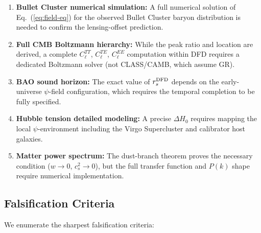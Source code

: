 \documentclass[aps,prd,twocolumn,superscriptaddress,nofootinbib]{revtex4-2}
\begin{document}
\begin{enumerate}
\item \textbf{Bullet Cluster numerical simulation:} A full numerical
  solution of Eq.~(\ref{eq:field-eq}) for the observed Bullet Cluster
  baryon distribution is needed to confirm the lensing-offset prediction.

\item \textbf{Full CMB Boltzmann hierarchy:} While the peak ratio
  and location are derived, a complete $C_\ell^{TT}$, $C_\ell^{TE}$,
  $C_\ell^{EE}$ computation within DFD requires a dedicated
  Boltzmann solver (not CLASS/CAMB, which assume GR).

\item \textbf{BAO sound horizon:} The exact value of $r_s^{\rm DFD}$
  depends on the early-universe $\psi$-field configuration, which
  requires the temporal completion to be fully specified.

\item \textbf{Hubble tension detailed modeling:} A precise $\Delta H_0$
  requires mapping the local $\psi$-environment including the
  Virgo Supercluster and calibrator host galaxies.

\item \textbf{Matter power spectrum:} The dust-branch theorem proves
  the necessary condition ($w \to 0$, $c_s^2 \to 0$), but the full
  transfer function and $P(k)$ shape require numerical implementation.
\end{enumerate}

\subsection{Falsification Criteria}

We enumerate the sharpest falsification criteria:
\end{document}
